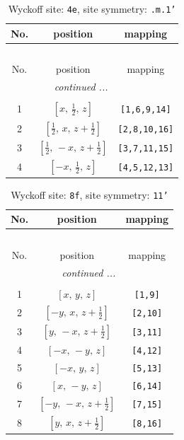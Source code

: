 \documentclass[fleqn,8pt]{jsarticle}
\begin{document}
\begin{longtable}{ccc}
\caption{Wyckoff site: {\tt 4e}, site symmetry: {\tt .m.1'}}
 \\
 \hline \hline
No. & position & mapping \\ \hline \endfirsthead

\multicolumn{2}{l}{\tablename\ \thetable{}} \\
 \hline \hline
No. & position & mapping \\ \hline \endhead

 \hline \hline
\multicolumn{2}{r}{\footnotesize\it continued ...} \\ \endfoot

 \hline \hline
\multicolumn{2}{r}{} \\ \endlastfoot

1 & $\left[ x,\, \frac{1}{2},\, z \right]$ & {\tt [1,6,9,14]} \\ \hline
2 & $\left[ \frac{1}{2},\, x,\, z + \frac{1}{2} \right]$ & {\tt [2,8,10,16]} \\ \hline
3 & $\left[ \frac{1}{2},\, - x,\, z + \frac{1}{2} \right]$ & {\tt [3,7,11,15]} \\ \hline
4 & $\left[ - x,\, \frac{1}{2},\, z \right]$ & {\tt [4,5,12,13]} \\
\end{longtable}
\renewcommand{\arraystretch}{1.2}
\begin{longtable}{ccc}
\caption{Wyckoff site: {\tt 8f}, site symmetry: {\tt 11'}}
 \\
 \hline \hline
No. & position & mapping \\ \hline \endfirsthead

\multicolumn{2}{l}{\tablename\ \thetable{}} \\
 \hline \hline
No. & position & mapping \\ \hline \endhead

 \hline \hline
\multicolumn{2}{r}{\footnotesize\it continued ...} \\ \endfoot

 \hline \hline
\multicolumn{2}{r}{} \\ \endlastfoot

1 & $\left[ x,\, y,\, z \right]$ & {\tt [1,9]} \\ \hline
2 & $\left[ - y,\, x,\, z + \frac{1}{2} \right]$ & {\tt [2,10]} \\ \hline
3 & $\left[ y,\, - x,\, z + \frac{1}{2} \right]$ & {\tt [3,11]} \\ \hline
4 & $\left[ - x,\, - y,\, z \right]$ & {\tt [4,12]} \\ \hline
5 & $\left[ - x,\, y,\, z \right]$ & {\tt [5,13]} \\ \hline
6 & $\left[ x,\, - y,\, z \right]$ & {\tt [6,14]} \\ \hline
7 & $\left[ - y,\, - x,\, z + \frac{1}{2} \right]$ & {\tt [7,15]} \\ \hline
8 & $\left[ y,\, x,\, z + \frac{1}{2} \right]$ & {\tt [8,16]} \\
\end{longtable}
\end{document}

